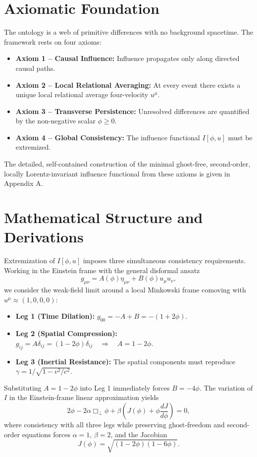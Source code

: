 \documentclass[11pt,a4paper]{article}
\begin{document}
\section{Axiomatic Foundation}
The ontology is a web of primitive differences with no background spacetime. The framework rests on four axioms:

\begin{itemize}
\item \textbf{Axiom 1 – Causal Influence:} Influence propagates only along directed causal paths.
\item \textbf{Axiom 2 – Local Relational Averaging:} At every event there exists a unique local relational average four-velocity $u^\mu$.
\item \textbf{Axiom 3 – Transverse Persistence:} Unresolved differences are quantified by the non-negative scalar $\phi \geq 0$.
\item \textbf{Axiom 4 – Global Consistency:} The influence functional $I[\phi, u]$ must be extremized.
\end{itemize}

The detailed, self-contained construction of the minimal ghost-free, second-order, locally Lorentz-invariant influence functional from these axioms is given in Appendix A.

\section{Mathematical Structure and Derivations}
Extremization of $I[\phi, u]$ imposes three simultaneous consistency requirements. Working in the Einstein frame with the general disformal ansatz
\[
g_{\mu\nu} = A(\phi)\eta_{\mu\nu} + B(\phi)u_\mu u_\nu,
\]
we consider the weak-field limit around a local Minkowski frame comoving with $u^\mu \approx (1,0,0,0)$:

\begin{itemize}
\item \textbf{Leg 1 (Time Dilation):} $g_{00} = -A + B = -(1 + 2\phi)$.
\item \textbf{Leg 2 (Spatial Compression):} $g_{ij} = A\delta_{ij} = (1 - 2\phi)\delta_{ij} \quad \Rightarrow \quad A = 1 - 2\phi$.
\item \textbf{Leg 3 (Inertial Resistance):} The spatial components must reproduce $\gamma = 1/\sqrt{1 - v^2/c^2}$.
\end{itemize}

Substituting $A = 1 - 2\phi$ into Leg 1 immediately forces $B = -4\phi$. The variation of $I$ in the Einstein-frame linear approximation yields
\[
2\phi - 2\alpha\Box_\perp\phi + \beta\left(J(\phi) + \phi\frac{dJ}{d\phi}\right) = 0,
\]
where consistency with all three legs while preserving ghost-freedom and second-order equations forces $\alpha = 1$, $\beta = 2$, and the Jacobian
\[
J(\phi) = \sqrt{(1-2\phi)(1-6\phi)}.
\]
\end{document}
